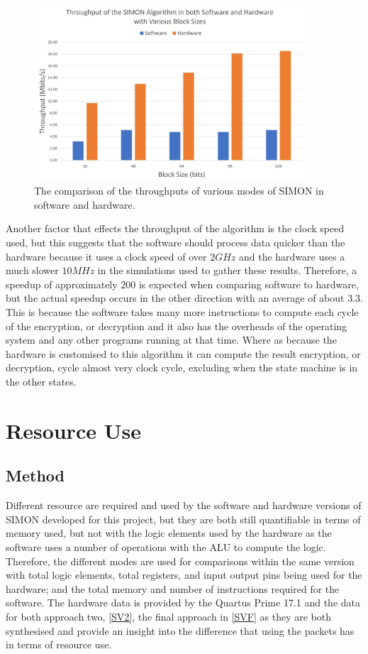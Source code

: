 \documentclass[12pt,twoside,a4paper]{report}
\begin{document}
	\begin{figure}[H]
		\includegraphics[width=0.9\textwidth]{SIMON_throughput}
		\centering
		\caption{The comparison of the throughputs of various modes of SIMON in software and hardware.}
		\label{fig:throughput}
	\end{figure}
	
	Another factor that effects the throughput of the algorithm is the clock speed used, but this suggests that the software should process data quicker than the hardware because it uses a clock speed of over $2GHz$ and the hardware uses a much slower $10MHz$ in the simulations used to gather these results. Therefore, a speedup of approximately $200$ is expected when comparing software to hardware, but the actual speedup occurs in the other direction with an average of about $3.3$. This is because the software takes many more instructions to compute each cycle of the encryption, or decryption and it also has the overheads of the operating system and any other programs running at that time. Where as because the hardware is customised to this algorithm it can compute the result encryption, or decryption, cycle almost very clock cycle, excluding when the state machine is in the other states.

	\section{Resource Use}
	
	\subsection{Method}
	
	Different resource are required and used by the software and hardware versions of SIMON developed for this project, but they are both still quantifiable in terms of memory used, but not with the logic elements used by the hardware as the software uses a number of operations with the ALU to compute the logic. Therefore, the different modes are used for comparisons within the same version with total logic elements, total registers, and input output pins being used for the hardware; and the total memory and number of instructions required for the software. The hardware data is provided by the Quartus Prime 17.1 and the data for both approach two, \autoref{SV2}, the final approach in \autoref{SVF} as they are both synthesised and provide an insight into the difference that using the packets has in terms of resource use.
	
\end{document}
